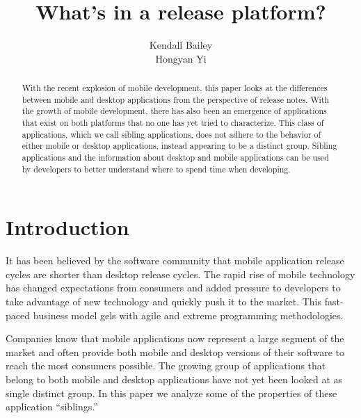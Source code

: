 \documentclass{acm_proc_article-sp}
\begin{document}
\title{What's in a release platform? }

\author{
\alignauthor
Kendall Bailey \\
\alignauthor
Hongyan Yi \\
}

\maketitle
\begin{abstract}

With the recent explosion of mobile development, this paper looks at the differences between mobile and desktop applications from the perspective of release notes.
With the growth of mobile development, there has also been an emergence of applications that exist on both platforms that no one has yet tried to characterize.
This class of applications, which we call sibling applications, does not adhere to the behavior of either mobile or desktop applications, instead appearing to be a distinct group.
Sibling applications and the information about desktop and mobile applications can be used by developers to better understand where to spend time when developing.

\end{abstract}


\section{Introduction}

It has been believed by the software community that mobile application release cycles are shorter than desktop release cycles. 
The rapid rise of mobile technology has changed expectations from consumers and added pressure to developers to take advantage of new technology and quickly push it to the market.
This fast-paced business model gels with agile and extreme programming methodologies.

Companies know that mobile applications now represent a large segment of the market and often provide both mobile and desktop versions of their software to reach the most consumers possible.
The growing group of applications that belong to both mobile and desktop applications have not yet been looked at as single distinct group.
In this paper we analyze some of the properties of these application ``siblings.''
\end{document}
